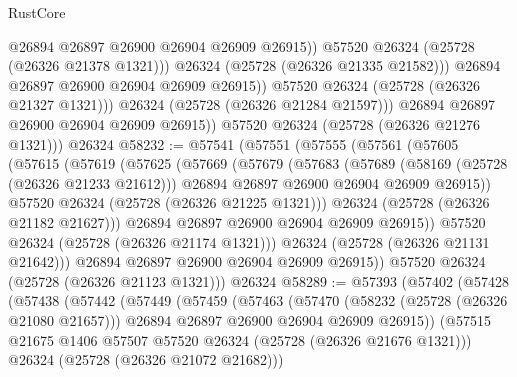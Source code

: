 \begin{lexlean}{RustCore}
\begin{coremodule}
                          @26894
                          @26897
                          @26900
                          @26904
                          @26909
                          @26915))
                      @57520
                      @26324
                      (@25728 (@26326 @21378 @1321)))
                    @26324
                    (@25728 (@26326 @21335 @21582)))
                  @26894
                  @26897
                  @26900
                  @26904
                  @26909
                  @26915))
              @57520
              @26324
              (@25728 (@26326 @21327 @1321)))
            @26324
            (@25728 (@26326 @21284 @21597)))
          @26894
          @26897
          @26900
          @26904
          @26909
          @26915))
      @57520
      @26324
      (@25728 (@26326 @21276 @1321)))
    @26324
@58232 := @57541
    (@57551
      (@57555
        (@57561
          (@57605
            (@57615
              (@57619
                (@57625
                  (@57669
                    (@57679
                      (@57683
                        (@57689
                          (@58169 (@25728 (@26326 @21233 @21612)))
                          @26894
                          @26897
                          @26900
                          @26904
                          @26909
                          @26915))
                      @57520
                      @26324
                      (@25728 (@26326 @21225 @1321)))
                    @26324
                    (@25728 (@26326 @21182 @21627)))
                  @26894
                  @26897
                  @26900
                  @26904
                  @26909
                  @26915))
              @57520
              @26324
              (@25728 (@26326 @21174 @1321)))
            @26324
            (@25728 (@26326 @21131 @21642)))
          @26894
          @26897
          @26900
          @26904
          @26909
          @26915))
      @57520
      @26324
      (@25728 (@26326 @21123 @1321)))
    @26324
@58289 := @57393
    (@57402
      (@57428
        (@57438
          (@57442
            (@57449
              (@57459
                (@57463
                  (@57470
                    (@58232 (@25728 (@26326 @21080 @21657)))
                    @26894
                    @26897
                    @26900
                    @26904
                    @26909
                    @26915))
                (@57515 @21675 @1406 @57507 @57520 @26324 (@25728 (@26326 @21676 @1321)))
                @26324
                (@25728 (@26326 @21072 @21682)))

\end{coremodule}
\end{lexlean}

